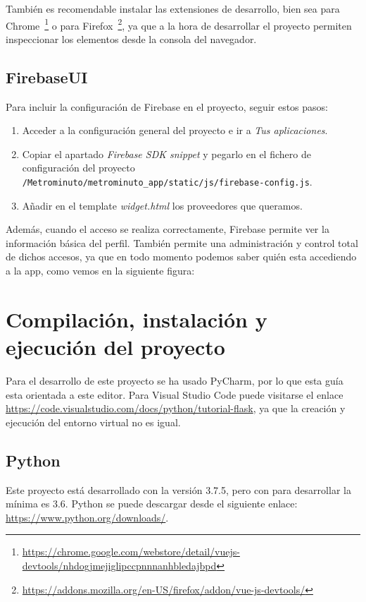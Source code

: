 También es recomendable instalar las extensiones de desarrollo, bien sea para Chrome~\footnote{\url{https://chrome.google.com/webstore/detail/vuejs-devtools/nhdogjmejiglipccpnnnanhbledajbpd}} o para Firefox~\footnote{\url{https://addons.mozilla.org/en-US/firefox/addon/vue-js-devtools/}}, ya que a la hora de desarrollar el proyecto permiten inspeccionar los elementos desde la consola del navegador.

\subsection{FirebaseUI}\label{firebase}
Para incluir la configuración de Firebase en el proyecto, seguir estos pasos:
\begin{enumerate}
	\item Acceder a la configuración general del proyecto e ir a \textit{Tus aplicaciones}.
	\item Copiar el apartado \textit{Firebase SDK snippet} y pegarlo en el fichero de configuración del proyecto \verb|/Metrominuto/metrominuto_app/static/js/firebase-config.js|.
	\item Añadir en el template \textit{widget.html} los proveedores que queramos.
\end{enumerate}

Además, cuando el acceso se realiza correctamente, Firebase permite ver la información básica del perfil. También permite una administración y control total de dichos accesos, ya que en todo momento podemos saber quién esta accediendo a la app, como vemos en la siguiente figura:

\section{Compilación, instalación y ejecución del proyecto}
Para el desarrollo de este proyecto se ha usado PyCharm, por lo que esta guía esta orientada a este editor. Para Visual Studio Code puede visitarse el enlace \url{https://code.visualstudio.com/docs/python/tutorial-flask}, ya que la creación y ejecución del entorno virtual no es igual.

\subsection{Python}
Este proyecto está desarrollado con la versión 3.7.5, pero con para desarrollar la mínima es 3.6. Python se puede descargar desde el siguiente enlace: \url{https://www.python.org/downloads/}.


